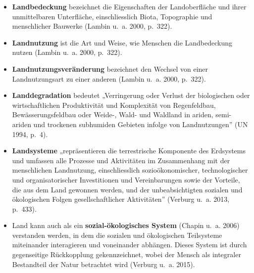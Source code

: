 \documentclass[
  nswissgerman,
  a4paper,
  openany]{book}
\begin{document}
\begin{itemize}
\item
  \textbf{Landbedeckung} bezeichnet die Eigenschaften der Landoberfläche
  und ihrer unmittelbaren Unterfläche, einschliesslich Biota,
  Topographie und menschlicher Bauwerke (Lambin u.~a. 2000, p.~322).
\item
  \textbf{Landnutzung} ist die Art und Weise, wie Menschen die
  Landbedeckung nutzen (Lambin u.~a. 2000, p.~322).
\item
  \textbf{Landnutzungsveränderung} bezeichnet den Wechsel von einer
  Landnutzungsart zu einer anderen (Lambin u.~a. 2000, p.~322).
\item
  \textbf{Landdegradation} bedeutet „Verringerung oder Verlust der
  biologischen oder wirtschaftlichen Produktivität und Komplexität von
  Regenfeldbau, Bewässerungsfeldbau oder Weide-, Wald- und Waldland in
  ariden, semi-ariden und trockenen subhumiden Gebieten infolge von
  Landnutzungen'' (UN 1994, p.~4).
\item
  \textbf{Landsysteme} „repräsentieren die terrestrische Komponente des
  Erdsystems und umfassen alle Prozesse und Aktivitäten im Zusammenhang
  mit der menschlichen Landnutzung, einschliesslich sozioökonomischer,
  technologischer und organisatorischer Investitionen und Vereinbarungen
  sowie der Vorteile, die aus dem Land gewonnen werden, und der
  unbeabsichtigten sozialen und ökologischen Folgen gesellschaftlicher
  Aktivitäten'' (Verburg u.~a. 2013, p.~433).
\item
  Land kann auch als ein \textbf{sozial-ökologisches System} (Chapin
  u.~a. 2006) verstanden werden, in dem die sozialen und ökologischen
  Teilsysteme miteinander interagieren und voneinander abhängen. Dieses
  System ist durch gegenseitige Rückkopplung gekennzeichnet, wobei der
  Mensch als integraler Bestandteil der Natur betrachtet wird (Verburg
  u.~a. 2015).
\end{itemize}
\end{document}
